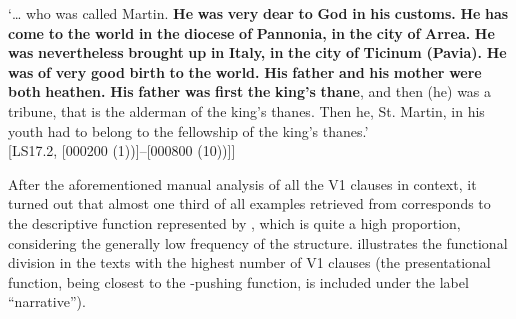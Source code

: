 \documentclass[output=paper,colorlinks,citecolor=brown]{langscibook}
\begin{document}
\glt ‘… who was called Martin. {\textbf{He} \textbf{was} \textbf{very} \textbf{dear} \textbf{to} \textbf{God} \textbf{in} \textbf{his} \textbf{customs.} \textbf{He} \textbf{has} \textbf{come} \textbf{to} \textbf{the} \textbf{world} \textbf{in} \textbf{the} \textbf{diocese} \textbf{of} \textbf{Pannonia,} \textbf{in} \textbf{the} \textbf{city} \textbf{of} \textbf{Arrea.} \textbf{He} \textbf{was} \textbf{nevertheless} \textbf{brought} \textbf{up} \textbf{in} \textbf{Italy,} \textbf{in} \textbf{the} \textbf{city} \textbf{of} \textbf{Ticinum} \textbf{(Pavia).} \textbf{He} \textbf{was} \textbf{of} \textbf{very} \textbf{good} \textbf{birth} \textbf{to} \textbf{the} \textbf{world.} \textbf{His} \textbf{father} \textbf{and} \textbf{his} \textbf{mother} \textbf{were} \textbf{both} \textbf{heathen.} \textbf{His} \textbf{father} \textbf{was} \textbf{first} \textbf{the} \textbf{king's} \textbf{thane}}, and then (he) was a tribune, that is the alderman of the king's thanes. Then he, St. Martin, in his youth had to belong to the fellowship of the king's thanes.' \\ \hfill [LS17.2, [000200 (1))]--[000800 (10))]]
\z

After the aforementioned manual analysis of all the V1 clauses in context, it turned out that almost one third of all examples retrieved from  corresponds to the descriptive function represented by , which is quite a high proportion, considering the generally low frequency of the structure.  illustrates the functional division in the texts with the highest number of V1 clauses (the presentational function, being closest to the -pushing function, is included under the label “narrative”).
\end{document}

